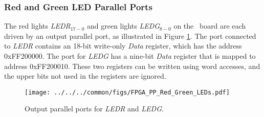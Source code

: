 \subsubsection{Red and Green LED Parallel Ports}

The red lights {\it LEDR}$_{17-0}$ and green lights {\it LEDG}$_{8-0}$ on the \DEBoard~board
are each driven by an output parallel port, as illustrated in Figure \ref{fig:LED_port}. The port
connected to {\it LEDR} contains an 18-bit write-only {\it Data} register, which has the
address {\sf 0xFF200000}. The port for {\it LEDG} has a nine-bit {\it Data}
register that is mapped to address {\sf 0xFF200010}. 
These two registers can be written using word accesses, and 
the upper bits not used in the registers are ignored.

\begin{figure}[h!]
   \begin{center}
       \texttt{[image: ../../../common/figs/FPGA\_PP\_Red\_Green\_LEDs.pdf]}
   \end{center}
   \caption{Output parallel ports for {\it LEDR} and {\it LEDG}.}
	\label{fig:LED_port}
\end{figure}